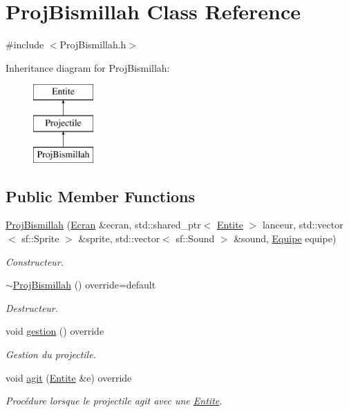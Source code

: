\hypertarget{class_proj_bismillah}{}\section{Proj\+Bismillah Class Reference}
\label{class_proj_bismillah}


{\ttfamily \#include $<$Proj\+Bismillah.\+h$>$}

Inheritance diagram for Proj\+Bismillah\+:\begin{figure}[H]
\begin{center}
\leavevmode
\includegraphics[height=3.000000cm]{class_proj_bismillah}
\end{center}
\end{figure}
\subsection*{Public Member Functions}
\begin{DoxyCompactItemize}
\item 
\mbox{\hyperlink{class_proj_bismillah_a52d694e47dd50315f8c52b3189e9b238}{Proj\+Bismillah}} (\mbox{\hyperlink{class_ecran}{Ecran}} \&ecran, std\+::shared\+\_\+ptr$<$ \mbox{\hyperlink{class_entite}{Entite}} $>$ lanceur, std\+::vector$<$ sf\+::\+Sprite $>$ \&sprite, std\+::vector$<$ sf\+::\+Sound $>$ \&sound, \mbox{\hyperlink{constantes_8h_a08fa5554288d5031a8f3bb83cc04ee83}{Equipe}} equipe)
\begin{DoxyCompactList}\small\item\em Constructeur. \end{DoxyCompactList}\item 
\mbox{\hyperlink{class_proj_bismillah_a13ce61097d38db5441c718e81177bf89}{$\sim$\+Proj\+Bismillah}} () override=default
\begin{DoxyCompactList}\small\item\em Destructeur. \end{DoxyCompactList}\item 
void \mbox{\hyperlink{class_proj_bismillah_a5a037871dddbe729c926e7d9eb69b026}{gestion}} () override
\begin{DoxyCompactList}\small\item\em Gestion du projectile. \end{DoxyCompactList}\item 
void \mbox{\hyperlink{class_proj_bismillah_a85f9cab1718a389d1e177806cb2c32c9}{agit}} (\mbox{\hyperlink{class_entite}{Entite}} \&e) override
\begin{DoxyCompactList}\small\item\em Procédure lorsque le projectile agit avec une \mbox{\hyperlink{class_entite}{Entite}}. \end{DoxyCompactList}\end{DoxyCompactItemize}
